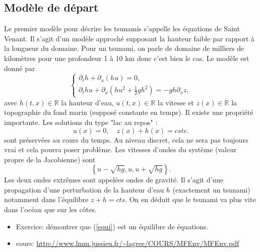 \documentclass[11pt]{article}
\theoremstyle{definition}
\begin{document}
\subsection{Modèle de départ}
Le premier modèle pour décrire les tsunamis s'appelle les équations de Saint Venant. Il s’agit d'un modèle approché supposant la hauteur faible par rapport à la longueur du domaine. Pour un tsunami, on parle de domaine de milliers de kilomètres pour une profondeur 1 à 10 km donc c'est bien le cas. Le modèle est donné par
$$
\left\{\begin{array}{l}
\partial_t h + \partial_x (hu) =0, \\
\partial_t hu + \partial_x \left(hu^2 + \frac12gh^2\right) = -gh\partial_x z,\end{array}\right.
$$
avec $h(t,x) \in \mathbb{R}$ la hauteur d'eau, $u(t,x) \in \mathbb{R}$ la vitesse et $z(x) \in \mathbb{R}$ la topographie du fond marin (supposé constante en temps). Il existe une propriété importante. Les solutions du type "lac au repos" :
\begin{equation}\label{equi}
u(x)=0, \quad z(x)+h(x)=cste.
\end{equation}
sont préservées au cours du temps.  Au niveau discret, cela ne sera pas toujours vrai et cela pourra poser problème.
Les vitesses d'ondes du système (valeur propre de la Jacobienne) sont
$$
\left\{u-\sqrt{hg},u,u+\sqrt{hg}\right\}.
$$
Les deux ondes extrêmes sont appelées ondes de gravité. Il s'agit d'une propagation d'une perturbation de la hauteur d'eau $h$ (exactement un tsunami) notamment dans l'équilibre $z+h=cts$. On en déduit que le tsunami va plus vite dans l'océan que sur les côtes.

\begin{itemize}
\item Exercice: démontrer que (\ref{equi}) est un équilibre de équations.
\end{itemize}

\begin{itemize}
\item cours: \url{http://www.lmm.jussieu.fr/~lagree/COURS/MFEnv/MFEnv.pdf}
\end{itemize}
\end{document}
